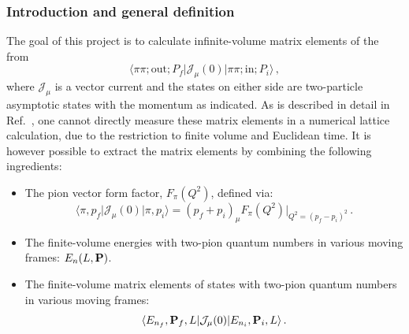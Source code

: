 \label{app:Gnum}

 

\subsubsection{Introduction and general definition \label{sec:Gfunc}}
The goal of this project is to calculate infinite-volume matrix elements of the from
\begin{equation}
\langle \pi \pi ; \mathrm{out}; P_f  \vert \mathcal J_\mu (0) \vert \pi \pi ; \mathrm{in}; P_i \rangle \,,
\end{equation}
where $\mathcal J_\mu$ is a vector current and the states on either side are two-particle asymptotic states with the momentum as indicated. As is described in detail in Ref.~\cite{BH2to2}, one cannot directly measure these matrix elements in a numerical lattice calculation, due to the restriction to finite volume and Euclidean time. It is however possible to extract the matrix elements by combining the following ingredients:
\begin{itemize}
\item The pion vector form factor, $F_{\pi}(Q^2)$, defined via:
\begin{equation}
\langle \pi, p_f \vert \mathcal J_\mu (0) \vert \pi , p_i \rangle = (p_f + p_i)_\mu F_{\pi}(Q^2) \bigg \vert_{Q^2 = (p_f-p_i)^2} \,.
\end{equation}
\item The finite-volume energies with two-pion quantum numbers in various moving frames: $E_n(L, \textbf P)$.
\item The finite-volume matrix elements of states with two-pion quantum numbers in various moving frames:
\begin{equation}
\langle E_{n_f}, \textbf P_f , L \vert \mathcal J_\mu (0) \vert E_{n_i}, \textbf P_i , L \rangle \,.
\end{equation}
\end{itemize}


